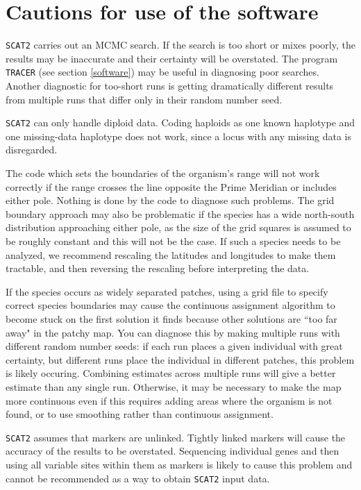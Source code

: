 \documentclass[10pt,titlepage,times,letterpaper]{article}
\def\SCAT{{\tt SCAT2} }
\begin{document}

\section{Cautions for use of the software} \label{cautions}

\SCAT carries out an MCMC search.  If the search is too short or mixes
poorly, the results may be inaccurate and their certainty will be overstated.  The program
{\tt TRACER} (see section \ref{software}) may be useful in diagnosing poor
searches.  Another diagnostic for too-short runs is getting dramatically different
results from multiple runs that differ only in their random number seed.

\SCAT can only handle diploid data.  Coding haploids as one known haplotype and
one missing-data haplotype does not work, since a locus with any missing
data is disregarded.

The code which sets the boundaries of the organism's range
will not work correctly if the range crosses the line opposite
the Prime Meridian or includes either pole.  Nothing is done by the code to
diagnose such problems.  
The grid boundary approach may also be problematic if the species has a wide
north-south distribution approaching either pole, as the size of the grid 
squares is assumed to be roughly constant and this will not be the case.
If such a species needs to be analyzed, we recommend rescaling the latitudes and
longitudes to make them tractable, and then reversing the rescaling before
interpreting the data.  

If the species occurs as widely separated patches, using a grid file
to specify correct species boundaries may cause the continuous assignment algorithm
to become stuck on the first solution it finds because other solutions are 
``too far away" in the patchy map.  You can diagnose this by making
multiple runs with different random number seeds:  if each run places a
given individual with great certainty, but different runs place the
individual in different patches, this problem is likely occuring.  Combining
estimates across multiple runs will give a better estimate than any
single run.  Otherwise, it may be necessary to make the map more continuous
even if this requires adding areas where the organism is not found, or to
use smoothing rather than continuous assignment.

\SCAT assumes that markers are unlinked.  Tightly linked markers will
cause the accuracy of the results to be overstated.  Sequencing individual
genes and then using all variable sites within them as markers is likely
to cause this problem and cannot be recommended as a way to obtain \SCAT
input data.
\end{document}
